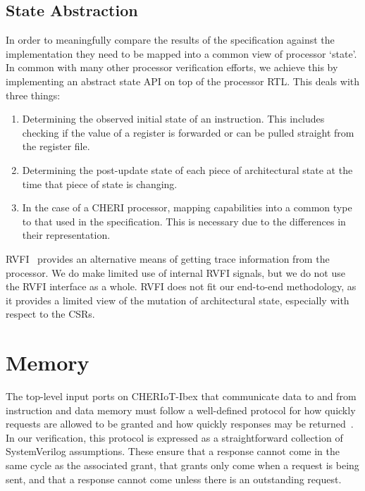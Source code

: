 \documentclass[10pt,conference]{IEEEtran}
\begin{document}
\subsection{State Abstraction}

In order to meaningfully compare the results of the specification against
the implementation they need to be mapped into a common view of processor
`state'. In common with many other processor verification efforts, we
achieve this by implementing an abstract state API on top of the processor
RTL. This deals with three things:

\begin{enumerate}
  \item Determining the observed initial state of an instruction. This includes
  checking if the value of a register is forwarded or can be pulled straight from the register file.
  \item Determining the post-update state of each piece of architectural state
  at the time that piece of state is changing.
  \item In the case of a CHERI processor, mapping capabilities into a common type to that used in the
  specification. This is necessary due to the differences in their representation.
\end{enumerate}

RVFI~\cite{RVFI} provides an alternative means of getting trace information
from the processor.  We do make limited use of internal RVFI signals,
but we do not use the RVFI interface as a whole. RVFI does not fit our
end-to-end methodology, as it provides a limited view of the mutation
of architectural state, especially with respect to the CSRs.

\section{Memory}\label{sec:memory}

The top-level input ports on CHERIoT-Ibex that communicate data to and from
instruction and data memory must follow a well-defined protocol for how
quickly requests are allowed to be granted and how quickly responses may be
returned~\cite{ibex-mem-docs}.  In our verification, this protocol is
expressed as a straightforward collection of SystemVerilog
assumptions. These ensure that a response cannot come in the same cycle as
the associated grant, that grants only come when a request is being sent,
and that a response cannot come unless there is an outstanding request.
\end{document}
